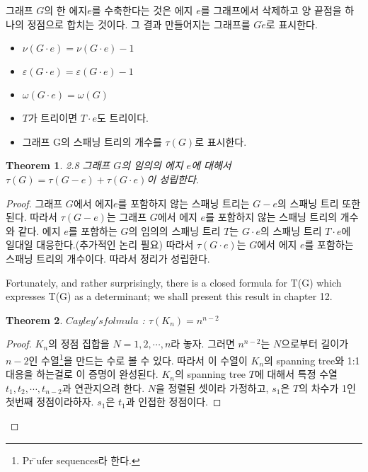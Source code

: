 \documentclass{oblivoir}
\newtheorem{theorem}{Theorem}[section]
\begin{document}
\begin{itemize}
    \begin{dfn}[contract]
        그래프 $G$의 한 에지$e$를 수축한다는 것은 에지 $e$를 그래프에서 삭제하고 양 끝점을 하나의 정점으로 합치는 것이다. 그 결과 만들어지는 그래프를 $G \dot e$로 표시한다.
        \begin{itemize}
            \item $\nu(G \cdot e) = \nu(G \cdot e) - 1$
            \item $\varepsilon(G \cdot e) = \varepsilon(G \cdot e)-1$
            \item $\omega(G \cdot e) = \omega(G)$
            \item  $T$가 트리이면 $T \cdot e$도 트리이다.
            \item 그래프 G의 스패닝 트리의 개수를 $\tau(G)$로 표시한다.
        \end{itemize}
    \end{dfn}

    \begin{theorem}
        2.8 그래프 $G$의 임의의 에지 $e$에 대해서 $\tau(G) =\tau(G-e) + \tau(G \cdot e)$이 성립한다.
    \end{theorem}

    \begin{proof}
        그래프 $G$에서 에지$e$를 포함하지 않는 스패닝 트리는 $G-e$의 스패닝 트리 또한 된다.
        따라서 $\tau(G-e)$는 그래프 $G$에서 에지 $e$를 포함하지 않는 스패닝 트리의 개수와 같다.
        에지 $e$를 포함하는 $G$의 임의의 스패닝 트리 $T$는 $G \cdot e$의 스패닝 트리 $T \cdot e$에 일대일 대응한다.(추가적인 논리 필요) 따라서 $\tau(G \cdot e)$는 $G$에서 에지 $e$를 포함하는 스패닝 트리의 개수이다. 따라서 정리가 성립한다.

    

    Fortunately, and rather surprisingly, there is a closed formula for T(G) which expresses T(G) as a determinant; 
    we shall present this result in chapter 12.


    \begin{theorem}
        $Cayley's folmula$ : $\tau(K_n)= n^{n-2}$
    \end{theorem}

    \begin{proof}
        $K_n$의 정점 집합을 $N = {1,2, \cdots,n}$라 놓자.
        그러면 $n^{n-2}$는  $N$으로부터 길이가 $n-2$인 수열\footnote{Pr ̈ufer sequences라 한다.}을 만드는 수로 볼 수 있다.
        따라서 이 수열이 $K_n$의 spanning tree와 1:1대응을 하는걸로 이 증명이 완성된다.
        $K_n$의 spanning tree $T$에 대해서 특정 수열 ${t_1, t_2, \cdots , t_{n-2}}$과 연관지으려 한다.
        $N$을 정렬된 셋이라 가정하고, $s_1$은 $T$의 차수가 1인 첫번째 정점이라하자. $s_1$은 $t_1$과 인접한 정점이다.
        

\end{proof}
\end{proof}
\end{itemize}
\end{document}
